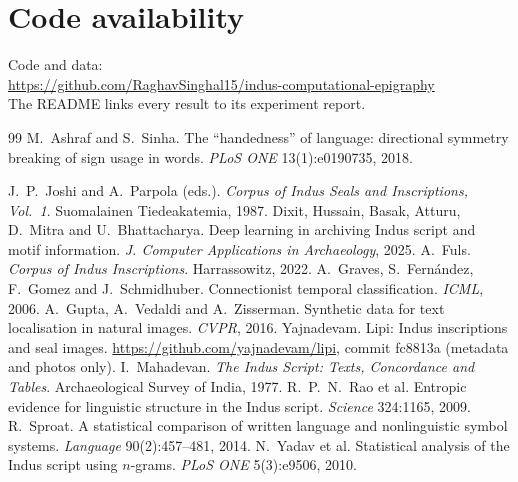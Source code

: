 \documentclass[11pt,a4paper,twocolumn]{article}
\newcommand{\githuburl}{https://github.com/RaghavSinghal15/indus-computational-epigraphy}
\begin{document}
\section*{Code availability}
\noindent Code and data:\\
\url{\githuburl}\\
The README links every result to its experiment report.

\begin{thebibliography}{99}
\small
{} M.~Ashraf and S.~Sinha. The ``handedness'' of language: directional symmetry breaking of sign usage in words. \emph{PLoS ONE} 13(1):e0190735, 2018.

 J.~P.~Joshi and A.~Parpola (eds.). \emph{Corpus of Indus Seals and Inscriptions, Vol.~1}. Suomalainen Tiedeakatemia, 1987.
 Dixit, Hussain, Basak, Atturu, D.~Mitra and U.~Bhattacharya. Deep learning in archiving Indus script and motif information. \emph{J. Computer Applications in Archaeology}, 2025.
 A.~Fuls. \emph{Corpus of Indus Inscriptions}. Harrassowitz, 2022.
 A.~Graves, S.~Fern\'andez, F.~Gomez and J.~Schmidhuber. Connectionist temporal classification. \emph{ICML}, 2006.
 A.~Gupta, A.~Vedaldi and A.~Zisserman. Synthetic data for text localisation in natural images. \emph{CVPR}, 2016.
 Yajnadevam. Lipi: Indus inscriptions and seal images. \url{https://github.com/yajnadevam/lipi}, commit fc8813a (metadata and photos only).
 I.~Mahadevan. \emph{The Indus Script: Texts, Concordance and Tables}. Archaeological Survey of India, 1977.
 R.~P.~N.~Rao et al. Entropic evidence for linguistic structure in the Indus script. \emph{Science} 324:1165, 2009.
 R.~Sproat. A statistical comparison of written language and nonlinguistic symbol systems. \emph{Language} 90(2):457--481, 2014.
 N.~Yadav et al. Statistical analysis of the Indus script using $n$-grams. \emph{PLoS ONE} 5(3):e9506, 2010.
\end{thebibliography}
\end{document}
